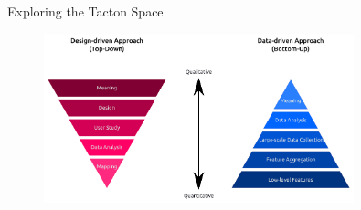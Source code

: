 
\begin{frame}{Exploring the Tacton Space}
    \begin{figure}[!htb]
    \centering
    \includegraphics[width=0.8\textwidth,height=\textheight,keepaspectratio]{Images/pyramids.png}
    \end{figure}
\end{frame}
